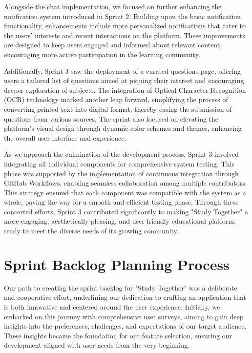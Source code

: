 Alongside the chat implementation, we focused on further enhancing the notification system introduced in Sprint 2. Building upon the basic notification functionality, enhancements include more personalized notifications that cater to the users' interests and recent interactions on the platform. These improvements are designed to keep users engaged and informed about relevant content, encouraging more active participation in the learning community.

Additionally, Sprint 3 saw the deployment of a curated questions page, offering users a tailored list of questions aimed at piquing their interest and encouraging deeper exploration of subjects. The integration of Optical Character Recognition (OCR) technology marked another leap forward, simplifying the process of converting printed text into digital format, thereby easing the submission of questions from various sources. The sprint also focused on elevating the platform's visual design through dynamic color schemes and themes, enhancing the overall user interface and experience.

As we approach the culmination of the development process, Sprint 3 involved integrating all individual components for comprehensive system testing. This phase was supported by the implementation of continuous integration through GitHub Workflows, enabling seamless collaboration among multiple contributors. This strategy ensured that each component was compatible with the system as a whole, paving the way for a smooth and efficient testing phase. Through these concerted efforts, Sprint 3 contributed significantly to making "Study Together" a more engaging, aesthetically pleasing, and user-friendly educational platform, ready to meet the diverse needs of its growing community.

\section{Sprint Backlog Planning Process}

Our path to creating the sprint backlog for "Study Together" was a deliberate and cooperative effort, underlining our dedication to crafting an application that is both innovative and centered around the user experience. Initially, we embarked on this journey with comprehensive user surveys, aiming to gain deep insights into the preferences, challenges, and expectations of our target audience. These insights became the foundation for our feature selection, ensuring our development aligned with user needs from the very beginning.

